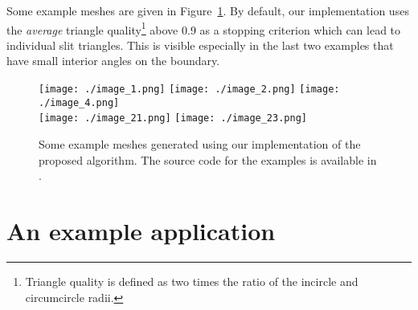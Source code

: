 \documentclass[11pt]{article}
\begin{document}
Some example meshes are given in Figure~\ref{fig:moreexamples}.  By
default, our implementation uses the \emph{average} triangle quality\footnote{Triangle
quality is defined as two times the ratio of the incircle and circumcircle
radii.} above 0.9 as a stopping criterion which can lead to individual slit triangles.
This is visible especially in the last two examples that have small
interior angles on the boundary.

\begin{figure}[htbp]
  \centering
  \texttt{[image: ./image\_1.png]}
  \texttt{[image: ./image\_2.png]}
  \texttt{[image: ./image\_4.png]}\\
  \texttt{[image: ./image\_21.png]}
  \texttt{[image: ./image\_23.png]}
  \caption{Some example meshes generated using our
    implementation of the proposed algorithm.
  The source code for the examples is available in \cite{tomgustafsson_2020}.}
\label{fig:moreexamples}
\end{figure}

\section{An example application}
\end{document}
